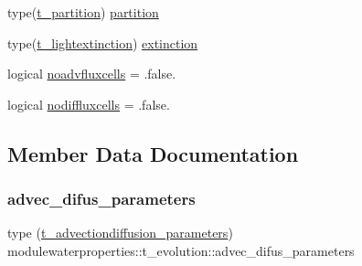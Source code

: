 \begin{DoxyCompactItemize}
\item 
type(\mbox{\hyperlink{structmodulewaterproperties_1_1t__partition}{t\+\_\+partition}}) \mbox{\hyperlink{structmodulewaterproperties_1_1t__evolution_a3c526ad876d2c907f3cef4f46b8a26ac}{partition}}
\item 
type(\mbox{\hyperlink{structmodulewaterproperties_1_1t__lightextinction}{t\+\_\+lightextinction}}) \mbox{\hyperlink{structmodulewaterproperties_1_1t__evolution_a2cbb5f57beb6185bcb255705af969b1d}{extinction}}
\item 
logical \mbox{\hyperlink{structmodulewaterproperties_1_1t__evolution_acdc2b389447c7556a09c2b610e8e6faa}{noadvfluxcells}} = .false.
\item 
logical \mbox{\hyperlink{structmodulewaterproperties_1_1t__evolution_a66380333ee58f7d9089c4bc9cbd276a8}{nodiffluxcells}} = .false.
\end{DoxyCompactItemize}


\subsection{Member Data Documentation}
\mbox{\label{structmodulewaterproperties_1_1t__evolution_a4c1754ec8dbf9fd974b278d4c9677615}} 
\subsubsection{\texorpdfstring{advec\+\_\+difus\+\_\+parameters}{advec\_difus\_parameters}}
{\footnotesize\ttfamily type (\mbox{\hyperlink{structmodulewaterproperties_1_1t__advectiondiffusion__parameters}{t\+\_\+advectiondiffusion\+\_\+parameters}}) modulewaterproperties\+::t\+\_\+evolution\+::advec\+\_\+difus\+\_\+parameters\hspace{0.3cm}{\ttfamily [private]}}

\mbox{\label{structmodulewaterproperties_1_1t__evolution_aa28e3451e8ec74d07429fd56e9273ad8}} 
